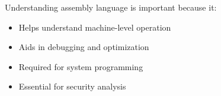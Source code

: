 \begin{remark}
Understanding assembly language is important because it:
\begin{itemize}
  \item Helps understand machine-level operation
  \item Aids in debugging and optimization
  \item Required for system programming
  \item Essential for security analysis
\end{itemize}
\end{remark}

